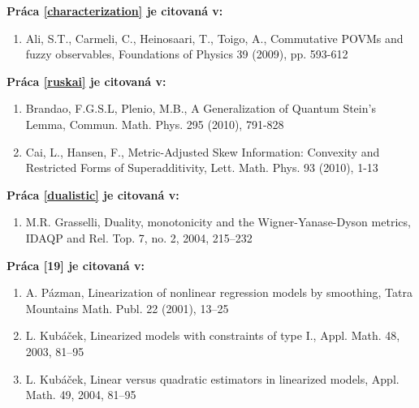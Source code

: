 \documentclass[A4paper]{article}
\begin{document}
{\bf Pr\'aca \ref{characterization} je citovan\'a v:}

\begin{enumerate}
\setcounter{enumi}{\value{poo}}
\item  Ali, S.T., Carmeli, C., Heinosaari, T., Toigo, A., Commutative POVMs
and fuzzy observables, Foundations of Physics 39 (2009), pp. 593-612

\setcounter{poo}{\value{enumi}}

\end{enumerate}


{\bf Pr\'aca \ref{ruskai} je citovan\'a v:}

\begin{enumerate}
\setcounter{enumi}{\value{poo}}
\item Brandao, F.G.S.L, Plenio, M.B.,  A Generalization of Quantum Stein's Lemma,
Commun. Math. Phys. 295 (2010), 791-828


\item Cai, L., Hansen, F., Metric-Adjusted Skew Information: Convexity and Restricted Forms of Superadditivity, Lett. Math. Phys. 93 (2010),  1-13 
\setcounter{poo}{\value{enumi}}

\end{enumerate}


{\bf Pr\'aca \ref{dualistic} je citovan\'a v:}

\begin{enumerate}

\setcounter{enumi}{\value{poo}}
\item   M.R. Grasselli, Duality, monotonicity and the Wigner-Yanase-Dyson
metrics,   IDAQP and Rel. Top. 7, no. 2, 2004, 215--232
\setcounter{poo}{\value{enumi}}

\end{enumerate}




{\bf Pr\'aca [19] je citovan\'a v:}
\begin{enumerate}

\item  A. P\'azman, Linearization of nonlinear regression models by
smoothing, Tatra Mountains Math. Publ. 22 (2001), 13--25

\item  L. Kub\'a\v cek, Linearized models with constraints of type I.,
Appl. Math. 48, 2003, 81--95

\item  L. Kub\'a\v cek, Linear versus  quadratic estimators in linearized
models, Appl. Math. 49, 2004, 81--95

\end{enumerate}
\end{document}
